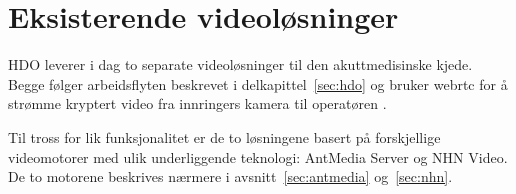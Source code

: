 



\section{Eksisterende videoløsninger}
\label{sec:eksisterende}
HDO leverer i dag to separate videoløsninger til den akuttmedisinske kjede. Begge følger arbeidsflyten beskrevet i delkapittel~\ref{sec:hdo} og bruker \gls{webrtc} for å strømme kryptert video fra innringers kamera til operatøren \cite{hdo_oppgave}.

Til tross for lik funksjonalitet er de to løsningene basert på forskjellige videomotorer med ulik underliggende teknologi: AntMedia Server og NHN Video. De to motorene beskrives nærmere i avsnitt~\ref{sec:antmedia} og~\ref{sec:nhn}.